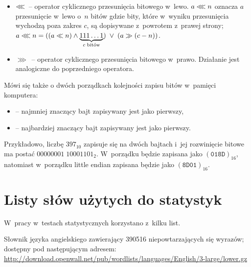 \begin{appendices}
\begin{itemize}
        \item $\llless$~-- operator cyklicznego przesunięcia bitowego w~lewo.
        $a \llless n$ oznacza $a$ przesunięcie w~lewo o~$n$ bitów gdzie bity,
        które w~wyniku przesunięcia wychodzą poza zakres $c$, są dopisywane
        z~powrotem z~prawej strony; $a \llless n =\break ((a \ll n) \land
        \underbrace{111\ldots1}_{c\;\text{bitów}}) \;\lor\; (a \gg (c-n))$.

        \item $\ggg$~-- operator cyklicznego przesunięcia bitowego w~prawo.
        Działanie jest analogiczne do poprzedniego operatora.

    \end{itemize}

    \noindent Mówi się także o dwóch porządkach kolejności zapisu bitów w~pamięci
    komputera:

    \begin{itemize}

        \item {} -- najmniej znaczący bajt zapisywany jest jako
        pierwszy,

        \item {} -- najbardziej znaczący bajt zapisywany jest jako
        pierwszy.

    \end{itemize}

    Przykładowo, liczbę $397_{10}$ zapisuje się na dwóch bajtach i~jej
    rozwinięcie bitowe ma postać ${00000001 \; 10001101}_2$. W~porządku  będzie zapisana jako $(\mathtt{01 8D})_{16}$, natomiast w~porządku \en
    {little endian} zapisana będzie jako $(\mathtt{8D 01})_{16}$.

\pagebreak
\section{Listy słów użytych do statystyk}
\label{app:wordlists}
W~pracy w~testach statystycznych korzystano z~kilku list.

    \begin{myenumerate}

        \item {}\label{wl:english_wordlist} Słownik
        języka angielskiego zawierający 390516 niepowtarzających się wyrazów;
        dostępny pod następującym adresem:
        \url{http://download.openwall.net/pub/wordlists/languages/English/3-large/lower.gz}


\end{myenumerate}
\end{appendices}
